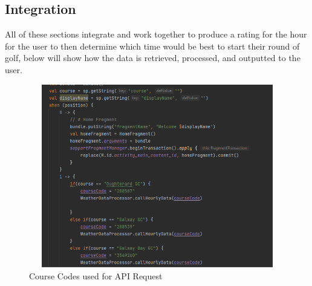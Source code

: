 \subsection{Integration}
All of these sections integrate and work together to produce a rating for the hour for the user to then determine which time would be best to start their round of golf, below will show how the data is retrieved, processed, and outputted to the user.
\begin{figure}[H]
    \centering
    \includegraphics[width=12cm,height = 8cm]{img/CourseCodes.PNG}
    \caption{Course Codes used for API Request}
    \label{fig:Course Codes used for API Request}
\end{figure}


